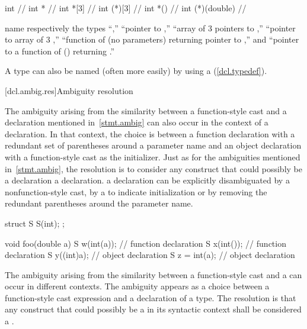 %
%
\begin{codeblock}
int				// 
int *				// 
int *[3]			// 
int (*)[3]			// 
int *()				// 
int (*)(double)			// 
\end{codeblock}

name respectively the types
``,''
``pointer to
,''
``array of 3 pointers to
,''
``pointer to array of 3
,''
``function of (no parameters) returning pointer to
,''
and ``pointer to a function of
()
returning
.''
\exitexample

\pnum
A type can also be named (often more easily) by using a
(\ref{dcl.typedef}).

[dcl.ambig.res]{Ambiguity resolution}%
%

\pnum
The ambiguity arising from the similarity between a function-style cast and
a declaration mentioned in~\ref{stmt.ambig} can also occur in the context of a declaration.
In that context, the choice is between a function declaration with
a redundant set of parentheses around a parameter name and an object declaration
with a function-style cast as the initializer.
Just as for the ambiguities mentioned in~\ref{stmt.ambig},
the resolution is to consider any construct that could possibly
be a declaration a declaration.
\enternote
a declaration can be explicitly disambiguated by a nonfunction-style
cast, by a
\tcode{=}
to indicate initialization or
by removing the redundant parentheses around the parameter name.
\exitnote
\enterexample

\begin{codeblock}
struct S {
    S(int);
};

void foo(double a)
{
    S w(int(a));		// function declaration
    S x(int());			// function declaration
    S y((int)a);		// object declaration
    S z = int(a);		// object declaration
}
\end{codeblock}
\exitexampleb

\pnum
The ambiguity arising from the similarity between a function-style
cast and a
can occur in different contexts.
The ambiguity appears as a choice between a function-style cast
expression and a declaration of a type.
The resolution is that any construct that could possibly be a
in its syntactic context shall be considered a
.

